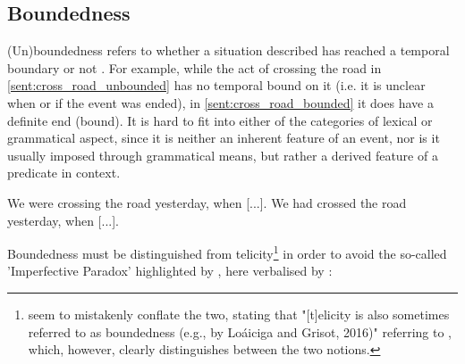\subsection{Boundedness}
\label{sect:boundedness}
(Un)boundedness refers to whether a situation described has reached a temporal boundary or not \citep{6608d9d0-a477-39af-8491-2172df5ae612}. For example, while the act of crossing the road in \ref{sent:cross_road_unbounded} has no temporal bound on it (i.e. it is unclear when or if the event was ended), in \ref{sent:cross_road_bounded} it does have a definite end (bound). It is hard to fit into either of the categories of lexical or grammatical aspect, since it is neither an inherent feature of an event, nor is it usually imposed through grammatical means, but rather a derived feature of a predicate in context.

\begin{exe}
    \ex We were crossing the road yesterday, when [...].
    \label{sent:cross_road_unbounded}
    \ex We had crossed the road yesterday, when [...].
    \label{sent:cross_road_bounded}
\end{exe}
Boundedness must be distinguished from telicity\footnote{\citet{friedrich-etal-2023-kind} seem to mistakenly conflate the two, stating that "[t]elicity is also sometimes referred to as boundedness (e.g., by Loáiciga and Grisot, 2016)" referring to \citet{loaiciga-grisot-2016-predicting}, which, however, clearly distinguishes between the two notions.} in order to avoid the so-called 'Imperfective Paradox' highlighted by \citet{dowty2012word}, here verbalised by \citet{zucchi}:

